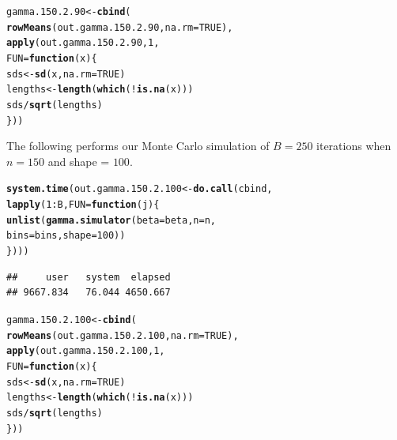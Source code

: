 \documentclass[11pt]{article}\usepackage[]{graphicx}\usepackage[]{color}
\makeatletter
\newcommand{\hlnum}[1]{\textcolor[rgb]{0.686,0.059,0.569}{#1}}%
\newcommand{\hlopt}[1]{\textcolor[rgb]{0,0,0}{#1}}%
\newcommand{\hlstd}[1]{\textcolor[rgb]{0.345,0.345,0.345}{#1}}%
\newcommand{\hlkwa}[1]{\textcolor[rgb]{0.161,0.373,0.58}{\textbf{#1}}}%
\newcommand{\hlkwb}[1]{\textcolor[rgb]{0.69,0.353,0.396}{#1}}%
\newcommand{\hlkwc}[1]{\textcolor[rgb]{0.333,0.667,0.333}{#1}}%
\newcommand{\hlkwd}[1]{\textcolor[rgb]{0.737,0.353,0.396}{\textbf{#1}}}%
\newenvironment{kframe}{%
 \def\at@end@of@kframe{}%
 \ifinner\ifhmode%
  \def\at@end@of@kframe{\end{minipage}}%
  \begin{minipage}{\columnwidth}%
 \fi\fi%
 \def\FrameCommand##1{\hskip\@totalleftmargin \hskip-\fboxsep
 \colorbox{shadecolor}{##1}\hskip-\fboxsep
     \hskip-\linewidth \hskip-\@totalleftmargin \hskip\columnwidth}%
 \MakeFramed {\advance\hsize-\width
   \@totalleftmargin\z@ \linewidth\hsize
   \@setminipage}}%
 {\par\unskip\endMakeFramed%
 \at@end@of@kframe}
\newenvironment{knitrout}{}{} %
\makeatother
\begin{document}
\begin{knitrout}
\color{fgcolor}\begin{kframe}
\begin{alltt}
\hlstd{gamma.150.2.90} \hlkwb{<-} \hlkwd{cbind}\hlstd{(}
  \hlkwd{rowMeans}\hlstd{(out.gamma.150.2.90,} \hlkwc{na.rm} \hlstd{=} \hlnum{TRUE}\hlstd{),}
  \hlkwd{apply}\hlstd{(out.gamma.150.2.90,} \hlnum{1}\hlstd{,}
  \hlkwc{FUN} \hlstd{=} \hlkwa{function}\hlstd{(}\hlkwc{x}\hlstd{)\{}
    \hlstd{sds} \hlkwb{<-} \hlkwd{sd}\hlstd{(x,} \hlkwc{na.rm} \hlstd{=} \hlnum{TRUE}\hlstd{)}
    \hlstd{lengths} \hlkwb{<-} \hlkwd{length}\hlstd{(}\hlkwd{which}\hlstd{(}\hlopt{!}\hlkwd{is.na}\hlstd{(x)))}
    \hlstd{sds} \hlopt{/} \hlkwd{sqrt}\hlstd{(lengths)}
  \hlstd{\}))}
\end{alltt}
\end{kframe}
\end{knitrout}

The following performs our Monte Carlo simulation of $B = 250$ iterations 
when $n = 150$ and shape = $100$.

\begin{knitrout}
\color{fgcolor}\begin{kframe}
\begin{alltt}
\hlkwd{system.time}\hlstd{(out.gamma.150.2.100} \hlkwb{<-} \hlkwd{do.call}\hlstd{(cbind,}
  \hlkwd{lapply}\hlstd{(}\hlnum{1}\hlopt{:}\hlstd{B,} \hlkwc{FUN} \hlstd{=} \hlkwa{function}\hlstd{(}\hlkwc{j}\hlstd{)\{}
    \hlkwd{unlist}\hlstd{(}\hlkwd{gamma.simulator}\hlstd{(}\hlkwc{beta} \hlstd{= beta,} \hlkwc{n} \hlstd{= n,}
      \hlkwc{bins} \hlstd{= bins,} \hlkwc{shape} \hlstd{=} \hlnum{100}\hlstd{))}
\hlstd{\})))}
\end{alltt}
\begin{verbatim}
##     user   system  elapsed 
## 9667.834   76.044 4650.667
\end{verbatim}
\end{kframe}
\end{knitrout}

\begin{knitrout}
\color{fgcolor}\begin{kframe}
\begin{alltt}
\hlstd{gamma.150.2.100} \hlkwb{<-} \hlkwd{cbind}\hlstd{(}
  \hlkwd{rowMeans}\hlstd{(out.gamma.150.2.100,} \hlkwc{na.rm} \hlstd{=} \hlnum{TRUE}\hlstd{),}
  \hlkwd{apply}\hlstd{(out.gamma.150.2.100,} \hlnum{1}\hlstd{,}
  \hlkwc{FUN} \hlstd{=} \hlkwa{function}\hlstd{(}\hlkwc{x}\hlstd{)\{}
    \hlstd{sds} \hlkwb{<-} \hlkwd{sd}\hlstd{(x,} \hlkwc{na.rm} \hlstd{=} \hlnum{TRUE}\hlstd{)}
    \hlstd{lengths} \hlkwb{<-} \hlkwd{length}\hlstd{(}\hlkwd{which}\hlstd{(}\hlopt{!}\hlkwd{is.na}\hlstd{(x)))}
    \hlstd{sds} \hlopt{/} \hlkwd{sqrt}\hlstd{(lengths)}
  \hlstd{\}))}
\end{alltt}
\end{kframe}
\end{knitrout}
\end{document}
